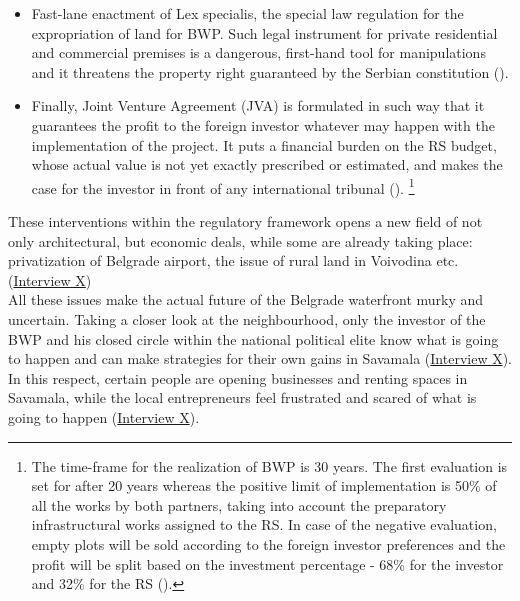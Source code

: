 \documentclass[11pt]{report}
\begin{document}
{\begin{itemize}
\item Fast-lane enactment of Lex specialis, the special law regulation for the expropriation of land for BWP.
Such legal instrument for private residential and commercial premises is a dangerous, first-hand tool for manipulations and it threatens the property right guaranteed by the Serbian constitution (\href{Media}{\cite{ref}}).

\item Finally, Joint Venture Agreement (JVA) is formulated in such way that it guarantees the profit to the foreign investor whatever may happen with the implementation of the project.
It puts a financial burden on the RS budget, whose actual value is not yet exactly prescribed or estimated, and makes the case for the investor in front of any international tribunal (\href{Media}{\cite{ref}}).
\footnote{The time-frame for the realization of BWP is 30 years. The first evaluation is set for after 20 years whereas the positive limit of implementation is 50\% of all the works by both partners, taking into account the preparatory infrastructural works assigned to the RS.
In case of the negative evaluation, empty plots will be sold according to the foreign investor preferences and the profit will be split based on the investment percentage - 68\% for the investor and 32\% for the RS (\href{NDVBGD}{\cite{NDVBGD analiza ugovora dokument????}}).}

\end{itemize}

These interventions within the regulatory framework opens a new field of not only architectural, but economic deals, while some are already taking place: privatization of Belgrade airport, the issue of rural land in Voivodina etc. 
(\href{InterviewX}{Interview X})
\\

All these issues make the actual future of the Belgrade waterfront murky and uncertain.
Taking a closer look at the neighbourhood, only the investor of the BWP and his closed circle within the national political elite know what is going to happen and can make strategies for their own gains in Savamala
(\href{InterviewX}{Interview X}).
In this respect, certain people are opening businesses and renting spaces in Savamala, while the local entrepreneurs feel frustrated and scared of what is going to happen (\href{InterviewX}{Interview X}).
\\

}
\end{document}
